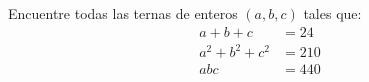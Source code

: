 Encuentre todas las ternas de enteros $(a, b, c)$ tales que:
\begin{align*}
a+b+c&=24\\
a^2+b^2+c^2&=210\\
abc&=440
\end{align*}
